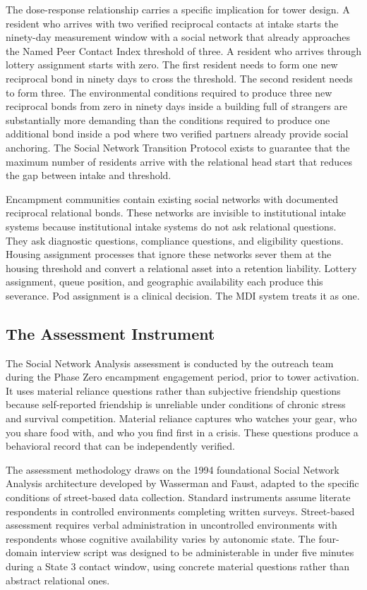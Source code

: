 \documentclass[12pt, letterpaper]{article}
\begin{document}
The dose-response relationship carries a specific implication for tower design. A resident who arrives with two verified reciprocal contacts at intake starts the ninety-day measurement window with a social network that already approaches the Named Peer Contact Index threshold of three. A resident who arrives through lottery assignment starts with zero. The first resident needs to form one new reciprocal bond in ninety days to cross the threshold. The second resident needs to form three. The environmental conditions required to produce three new reciprocal bonds from zero in ninety days inside a building full of strangers are substantially more demanding than the conditions required to produce one additional bond inside a pod where two verified partners already provide social anchoring. The Social Network Transition Protocol exists to guarantee that the maximum number of residents arrive with the relational head start that reduces the gap between intake and threshold.

Encampment communities contain existing social networks with documented reciprocal relational bonds. These networks are invisible to institutional intake systems because institutional intake systems do not ask relational questions. They ask diagnostic questions, compliance questions, and eligibility questions. Housing assignment processes that ignore these networks sever them at the housing threshold and convert a relational asset into a retention liability. Lottery assignment, queue position, and geographic availability each produce this severance. Pod assignment is a clinical decision. The MDI system treats it as one.

\subsection{The Assessment Instrument}

The Social Network Analysis assessment is conducted by the outreach team during the Phase Zero encampment engagement period, prior to tower activation. It uses material reliance questions rather than subjective friendship questions because self-reported friendship is unreliable under conditions of chronic stress and survival competition. Material reliance captures who watches your gear, who you share food with, and who you find first in a crisis. These questions produce a behavioral record that can be independently verified.

The assessment methodology draws on the 1994 foundational Social Network Analysis architecture developed by Wasserman and Faust, adapted to the specific conditions of street-based data collection. Standard instruments assume literate respondents in controlled environments completing written surveys. Street-based assessment requires verbal administration in uncontrolled environments with respondents whose cognitive availability varies by autonomic state. The four-domain interview script was designed to be administerable in under five minutes during a State 3 contact window, using concrete material questions rather than abstract relational ones.
\end{document}
